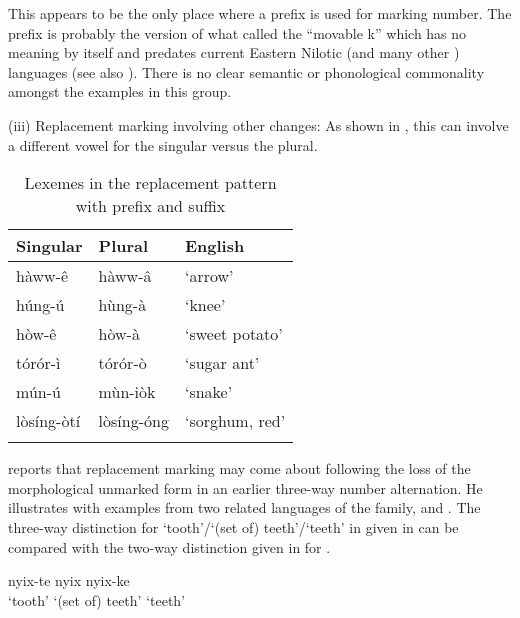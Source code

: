 \documentclass[output=paper]{langsci/langscibook}
\begin{document}
This appears to be the only place where a prefix is used for marking number. The prefix is probably the  version of what \citet{Greenberg1981} called the “movable k” which has no meaning by itself and predates current Eastern Nilotic (and many other ) languages (see also \citealt[251]{Dimmendaal1983}). There is no clear semantic or phonological commonality amongst the examples in this group.

(iii) Replacement marking involving other changes: As shown in , this can involve a different vowel for the singular versus the plural.

\begin{table}

\begin{tabularx}{.66\textwidth}{XXX}
\lsptoprule

 {Singular} & {Plural} & {English}\\ \midrule
 hàww-\^{e} &  hàww-\^{a} & ‘arrow’\\
 húng-ú &  hùng-à & ‘knee’\\
 hòw-\^{e} &  hòw-à & ‘sweet potato’\\
 tórór-ì &  tórór-ò & ‘sugar ant’\\
 mún-ú &  mùn-iòk & ‘snake’\\
 lòsíng-òtí &  lòsíng-óng & ‘sorghum, red’\\
\lspbottomrule
\end{tabularx}
\caption{Lexemes in the replacement pattern with prefix and suffix}
\label{tab:moodie:16}
\end{table}

\citet[242]{Dimmendaal2000} reports that replacement marking may come about following the loss of the morphological unmarked form in an earlier three-way number alternation. He illustrates with examples from two related  languages of the  family,  and . The three-way distinction for ‘tooth’/‘(set of) teeth’/‘teeth’ in  given in  can be compared with the two-way distinction given in  for .

\ea\label{ex:moodie:4}
 \citep[242]{Dimmendaal2000}

\gll nyix-te nyix nyix-ke \\
‘tooth’ {‘(set of) teeth’} ‘teeth’ \\
\z

\ea\label{ex:moodie:5}
 \citep[243]{Dimmendaal2000}
\end{document}
